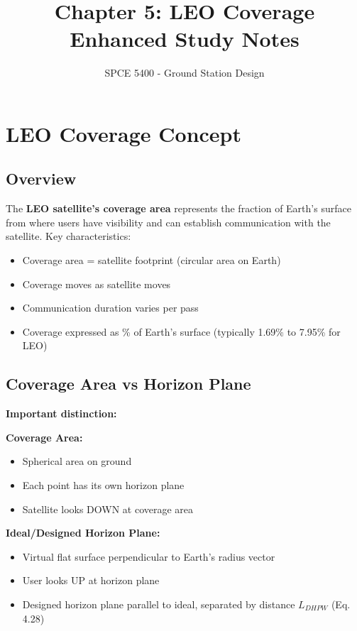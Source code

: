 \documentclass[11pt,letterpaper]{article}
\title{\textbf{Chapter 5: LEO Coverage} \\ Enhanced Study Notes}
\author{SPCE 5400 - Ground Station Design}
\date{}
\begin{document}
\maketitle

\tableofcontents
\newpage

\section{LEO Coverage Concept}

\subsection{Overview}
The \textbf{LEO satellite's coverage area} represents the fraction of Earth's surface from where users have visibility and can establish communication with the satellite. Key characteristics:

\begin{itemize}
    \item Coverage area = satellite footprint (circular area on Earth)
    \item Coverage moves as satellite moves
    \item Communication duration varies per pass
    \item Coverage expressed as \% of Earth's surface (typically 1.69\% to 7.95\% for LEO)
\end{itemize}

\subsection{Coverage Area vs Horizon Plane}
\textbf{Important distinction:}

\textbf{Coverage Area:}
\begin{itemize}
    \item Spherical area on ground
    \item Each point has its own horizon plane
    \item Satellite looks DOWN at coverage area
\end{itemize}

\textbf{Ideal/Designed Horizon Plane:}
\begin{itemize}
    \item Virtual flat surface perpendicular to Earth's radius vector
    \item User looks UP at horizon plane
    \item Designed horizon plane parallel to ideal, separated by distance $L_{DHPW}$ (Eq. 4.28)
\end{itemize}
\end{document}
